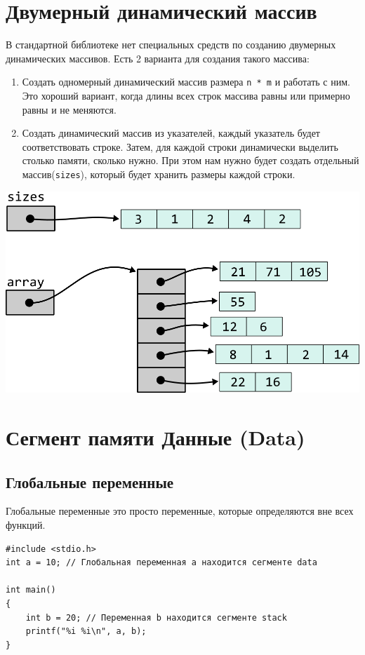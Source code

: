 \documentclass{article}
\begin{document}
\section*{Двумерный динамический массив}
В стандартной библиотеке нет специальных средств по созданию
двумерных динамических массивов. Есть 2 варианта для создания
такого массива:
\begin{enumerate}
\item Создать одномерный динамический массив размера \texttt{n * m} и работать с ним.
Это хороший вариант, когда длины всех строк массива равны или примерно равны и не меняются.
\item Создать динамический массив из указателей, каждый указатель будет 
соответствовать строке. Затем, для каждой строки динамически выделить столько памяти,
сколько нужно. При этом нам нужно будет создать отдельный массив(\texttt{sizes}), который будет хранить
размеры каждой строки.
\end{enumerate}
\begin{center}
\includegraphics[scale=1]{../images/pointer_schemes/two_dim_dynamic_array.png}
\end{center}

\newpage
\section*{Сегмент памяти Данные (Data)}

\subsection*{Глобальные переменные}
Глобальные переменные это просто переменные, которые определяются вне всех функций.
\begin{lstlisting}
#include <stdio.h>
int a = 10; // Глобальная переменная a находится сегменте data

int main() 
{
    int b = 20; // Переменная b находится сегменте stack
    printf("%i %i\n", a, b);
}
\end{lstlisting}
\end{document}
